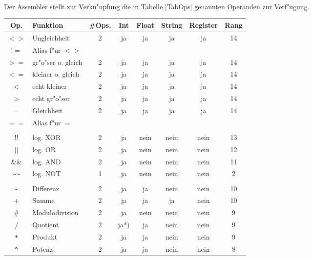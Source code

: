 \documentclass[12pt,a4paper,twoside]{report}
\begin{document}
Der Assembler stellt zur Verkn"upfung die in Tabelle \ref{TabOps} genannten
Operanden zur Verf"ugung.
\begin{table*}[htbp]
\begin{center}\begin{tabular}{|c|l|c|c|c|c|c|c|}
\hline
Op. & Funktion & \#Ops. & Int & Float & String & Register & Rang \\
\hline
\hline
$<>$        & Ungleichheit         & 2 & ja   & ja   & ja   & ja   & 14 \\
$!=$        & Alias f"ur $<>$      &   &      &      &      &      &    \\
$>=$        & gr"o"ser o. gleich   & 2 & ja   & ja   & ja   & ja   & 14 \\
$<=$        & kleiner o. gleich    & 2 & ja   & ja   & ja   & ja   & 14 \\
$<$         & echt kleiner         & 2 & ja   & ja   & ja   & ja   & 14 \\
$>$         & echt gr"o"ser        & 2 & ja   & ja   & ja   & ja   & 14 \\
$=$         & Gleichheit           & 2 & ja   & ja   & ja   & ja   & 14 \\
$==$        & Alias f"ur $=$       &   &      &      &      &      &    \\
            & & & & & &  \\
$!!$        & log. XOR             & 2 & ja   & nein & nein & nein & 13 \\
$||$        & log. OR              & 2 & ja   & nein & nein & nein & 12 \\
\&\&        & log. AND             & 2 & ja   & nein & nein & nein & 11 \\
\verb! ~~ ! & log. NOT             & 1 & ja   & nein & nein & nein & 2 \\
            & & & & & &  \\
-           & Differenz            & 2 & ja   & ja   & nein & nein & 10 \\
+           & Summe                & 2 & ja   & ja   & ja   & nein & 10 \\
\#          & Modulodivision       & 2 & ja   & nein & nein & nein & 9 \\
/           & Quotient             & 2 & ja*) & ja   & nein & nein & 9 \\
\verb! * !  & Produkt              & 2 & ja   & ja   & nein & nein & 9 \\
\verb! ^ !  & Potenz               & 2 & ja   & ja   & nein & nein & 8 \\

\end{tabular}
\end{center}
\end{table*}
\end{document}
